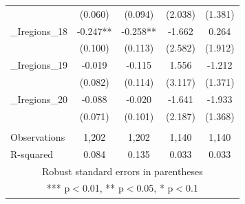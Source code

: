 \documentclass[]{article}
\begin{document}
\begin{tabular}{lcccc}
 & (0.060) & (0.094) & (2.038) & (1.381) \\
\_Iregions\_18 & -0.247** & -0.258** & -1.662 & 0.264 \\
 & (0.100) & (0.113) & (2.582) & (1.912) \\
\_Iregions\_19 & -0.019 & -0.115 & 1.556 & -1.212 \\
 & (0.082) & (0.114) & (3.117) & (1.371) \\
\_Iregions\_20 & -0.088 & -0.020 & -1.641 & -1.933 \\
 & (0.071) & (0.101) & (2.187) & (1.368) \\
 &  &  &  &  \\
Observations & 1,202 & 1,202 & 1,140 & 1,140 \\
 R-squared & 0.084 & 0.135 & 0.033 & 0.033 \\ \hline
\multicolumn{5}{c}{ Robust standard errors in parentheses} \\
\multicolumn{5}{c}{ *** p$<$0.01, ** p$<$0.05, * p$<$0.1} \\
\end{tabular}
\end{document}

